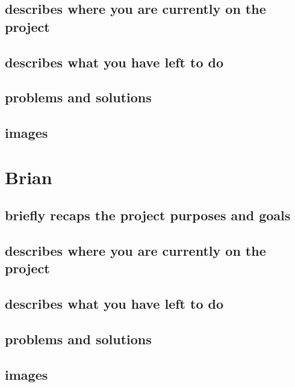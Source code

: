 \documentclass[onecolumn, draftclsnofoot,10pt, compsoc]{IEEEtran}
\begin{document}
\subsection{describes where you are currently on the project}

\subsection{describes what you have left to do}


\subsection{problems and solutions}


\subsection{images}

\section{Brian}

\subsection{briefly recaps the project purposes and goals}


\subsection{describes where you are currently on the project}

\subsection{describes what you have left to do}


\subsection{problems and solutions}


\subsection{images}







\end{document}
